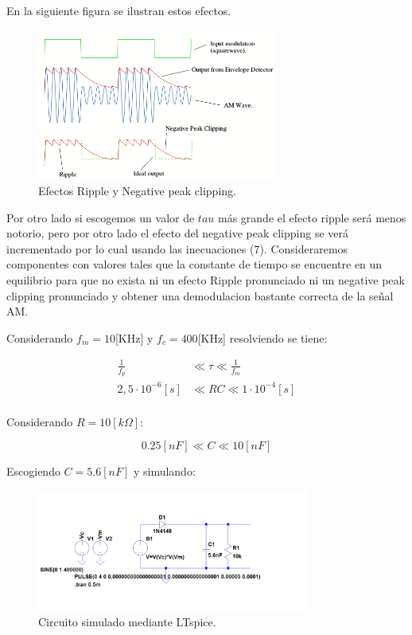 \documentclass[letterpaper, titlepage]{article}
\begin{document}
		En la siguiente figura se ilustran estos efectos.	
	
		\begin{figure}[H]
			\centering
				\includegraphics[width=0.7\textwidth]{demodulacion1}
			\caption{Efectos Ripple y Negative peak clipping.}
			\label{fig:ejemplo}
		\end{figure}


		Por otro lado si escogemos un valor de $tau$ más grande el efecto ripple será menos notorio, pero por otro lado el efecto del negative peak clipping se verá incrementado por lo cual usando las inecuaciones (7). Consideraremos componentes con valores tales que la constante de tiempo se encuentre en un equilibrio para que no exista ni un efecto Ripple pronunciado ni un negative peak clipping pronunciado y obtener una demodulacion bastante correcta de la señal AM.
		
		Considerando $ f_{m} = 10$[KHz] y $ f_{c} = 400$[KHz]  resolviendo se tiene:

		\begin{align*}
			\frac{1}{f_{p}}& \ll \tau \ll  \frac{1}{f_{m}} \\
			2,5\cdot10^{-6} [s] &  \ll RC \ll  1\cdot10^{-4} [s] \\
		\end{align*}

		Considerando $ R = 10[k \Omega] $:

		\begin{equation}
			0.25[nF]   \ll C \ll  10[nF]
		\end{equation}

		\newpage
		Escogiendo $ C = 5.6[nF] $ y simulando:

		\begin{figure}[H]
			\centering
				\includegraphics[width=0.8\textwidth]{circuitosim}
			\caption{Circuito simulado mediante LTspice.}
			\label{fig:ejemplo}
		\end{figure}
\end{document}
